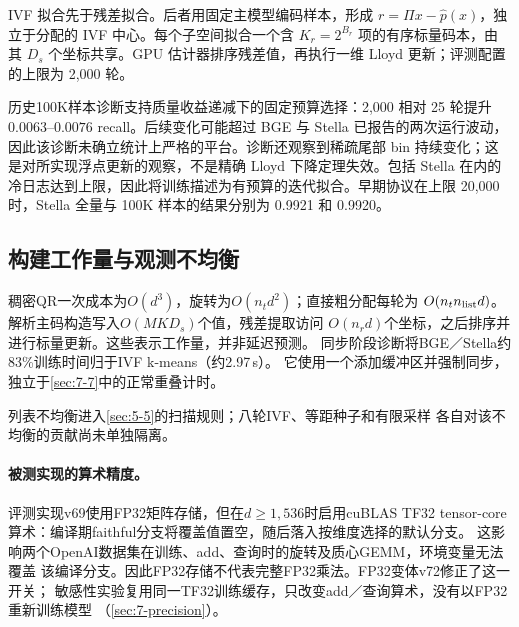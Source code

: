 IVF 拟合先于残差拟合。后者用固定主模型编码样本，形成 $r=\Pi x-\widehat p(x)$，独立于分配的 IVF 中心。每个子空间拟合一个含 $K_r=2^{B_r}$ 项的有序标量码本，由其 $D_s$ 个坐标共享。GPU 估计器排序残差值，再执行一维 Lloyd 更新；评测配置的上限为 2,000 轮。


历史100K样本诊断支持质量收益递减下的固定预算选择：2,000 相对 25 轮提升 $0.0063$--$0.0076$ recall。后续变化可能超过 BGE 与 Stella 已报告的两次运行波动，因此该诊断未确立统计上严格的平台。诊断还观察到稀疏尾部 bin 持续变化；这是对所实现浮点更新的观察，不是精确 Lloyd 下降定理失效。包括 Stella 在内的冷日志达到上限，因此将训练描述为有预算的迭代拟合。早期协议在上限 20,000 时，Stella 全量与 100K 样本的结果分别为 0.9921 和 0.9920。

\subsection{构建工作量与观测不均衡}

稠密QR一次成本为$O(d^3)$，旋转为$O(n_t d^2)$；直接粗分配每轮为
$O(n_t n_{\rm list}d)$。解析主码构造写入$O(MKD_s)$个值，残差提取访问
$O(n_r d)$个坐标，之后排序并进行标量更新。这些表示工作量，并非延迟预测。
同步阶段诊断将BGE／Stella约83\%训练时间归于IVF k-means（约2.97\,s）。
它使用一个添加缓冲区并强制同步，独立于\cref{sec:7-7}中的正常重叠计时。


列表不均衡进入\cref{sec:5-5}的扫描规则；八轮IVF、等距种子和有限采样
各自对该不均衡的贡献尚未单独隔离。


\paragraph{被测实现的算术精度。}
评测实现v69使用FP32矩阵存储，但在$d\geq1{,}536$时启用cuBLAS TF32 tensor-core
算术：编译期faithful分支将覆盖值置空，随后落入按维度选择的默认分支。
这影响两个OpenAI数据集在训练、add、查询时的旋转及质心GEMM，环境变量无法覆盖
该编译分支。因此FP32存储不代表完整FP32乘法。FP32变体v72修正了这一开关；
敏感性实验复用同一TF32训练缓存，只改变add／查询算术，没有以FP32重新训练模型
（\cref{sec:7-precision}）。
